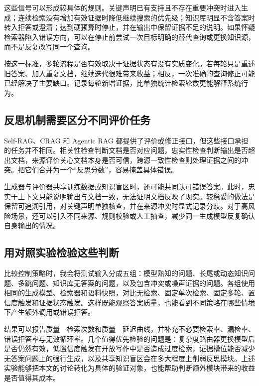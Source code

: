 这些信号可以形成较具体的规则。关键声明已有支持且不存在重要冲突时进入生成；连续检索没有增加有效证据时降低继续搜索的优先级；知识库明显不含答案时转入拒答或澄清；达到硬预算时停止，并在输出中保留证据不足的说明。如果怀疑检索器陷入错误方向，可以在停止前尝试一次目标明确的替代查询或更换知识源，而不是反复改写同一个查询。

按这一标准，多轮流程是否有效取决于证据状态有没有实质变化。若每轮只是重述旧答案、加入重复文档，继续迭代很难带来收益；相反，一次准确的查询修正可能已经解决了主要缺口。记录每轮新增证据，比单独统计检索轮数更能解释系统行为。

\subsection{反思机制需要区分不同评价任务}

Self-RAG、CRAG 和 Agentic RAG 都提供了评价或修正接口，但这些接口承担的任务并不相同。相关性检查判断文档是否对应问题，忠实性检查判断输出是否超出文档，来源评价关心文档本身是否可信，跨源一致性检查则处理证据之间的冲突。把它们合并为一个“反思分数”，容易掩盖具体错误。

生成器与评价器共享训练数据或知识盲区时，还可能共同认可错误答案。此时，忠实于上下文只能说明输出与文档一致，无法证明文档反映了现实。较稳妥的做法是保留可追溯引用，对关键声明单独核查，并在来源冲突时显式记录分歧。对于高风险场景，还可以引入不同来源、规则校验或人工抽查，减少同一生成模型反复确认自身输出的情况。

\subsection{用对照实验检验这些判断}

比较控制策略时，我会将测试输入分成五组：模型熟知的问题、长尾或动态知识问题、多跳问题、知识库无答案的问题，以及包含冲突或噪声证据的问题。各组使用相同的生成模型、检索器和语料快照，对比无检索、固定单次检索、固定多轮、置信度触发和证据状态触发。这样既能观察答案质量，也能看到不同策略在哪些情境下产生额外调用或错误拒答。

结果可以报告质量—检索次数和质量—延迟曲线，并补充不必要检索率、漏检率、错误拒答率与无效循环率。几个值得优先检验的问题是：复杂度路由器更换模型后是否仍然有效，低置信度触发在开放写作中是否造成过度检索，证据槽位能否减少无答案问题上的强行生成，以及共享知识盲区会在多大程度上削弱反思模块。上述实验能够把本文的讨论转化为具体的验证对象，也能帮助判断额外模块带来的收益是否值得其成本。

